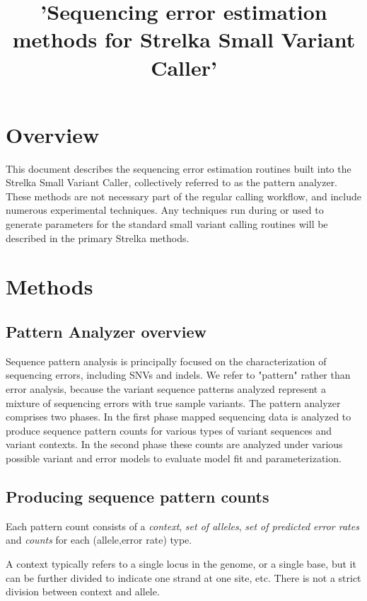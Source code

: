 \documentclass{article}
\title{'Sequencing error estimation methods for Strelka Small Variant Caller'}
\begin{document}
\maketitle

\tableofcontents

\section{Overview}

This document describes the sequencing error estimation routines built into the Strelka Small Variant Caller, collectively referred to as the pattern analyzer. These methods are not necessary part of the regular calling workflow, and include numerous experimental techniques. Any techniques run during or used to generate parameters for the standard small variant calling routines will be described in the primary Strelka methods.

\section{Methods}

\subsection{Pattern Analyzer overview}

Sequence pattern analysis is principally focused on the characterization of sequencing errors, including SNVs and indels. We refer to "pattern" rather than error analysis, because the variant sequence patterns analyzed represent a mixture of sequencing errors with true sample variants. The pattern analyzer comprises two phases. In the first phase mapped sequencing data is analyzed to produce sequence pattern counts for various types of variant sequences and variant contexts. In the second phase these counts are analyzed under various possible variant and error models to evaluate model fit and parameterization.

\subsection{Producing sequence pattern counts}

Each pattern count consists of a \emph{context}, \emph{set of alleles}, \emph{set of predicted error rates} and \emph{counts} for each (allele,error rate) type.

A context typically refers to a single locus in the genome, or a single base, but it can be further divided to indicate one strand at one site, etc. There is not a strict division between context and allele.
\end{document}
